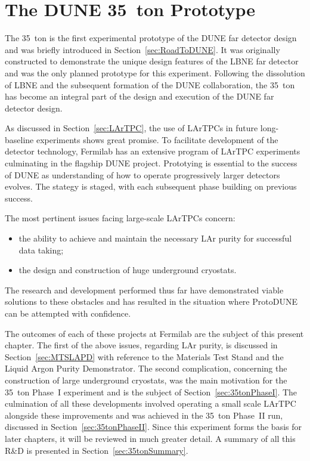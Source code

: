 
\graphicspath{{35ton/Figs/}}

\chapter{The DUNE 35~ton Prototype}\label{chap:35ton}

The 35~ton is the first experimental prototype of the DUNE far detector design and was briefly introduced in Section~\ref{sec:RoadToDUNE}.  It was originally constructed to demonstrate the unique design features of the LBNE far detector and was the only planned prototype for this experiment.  Following the dissolution of LBNE and the subsequent formation of the DUNE collaboration, the 35~ton has become an integral part of the design and execution of the DUNE far detector design.

As discussed in Section~\ref{sec:LArTPC}, the use of LArTPCs in future long-baseline experiments shows great promise.  To facilitate development of the detector technology, Fermilab has an extensive program of LArTPC experiments culminating in the flagship DUNE project.  Prototying is essential to the success of DUNE as understanding of how to operate progressively larger detectors evolves.  The stategy is staged, with each subsequent phase building on previous success.

The most pertinent issues facing large-scale LArTPCs concern:
\begin{itemize}
  \item the ability to achieve and maintain the necessary LAr purity for successful data taking;
  \item the design and construction of huge underground cryostats.
\end{itemize}
The research and development performed thus far have demonstrated viable solutions to these obstacles and has resulted in the situation where ProtoDUNE can be attempted with confidence.

The outcomes of each of these projects at Fermilab are the subject of this present chapter.  The first of the above issues, regarding LAr purity, is discussed in Section~\ref{sec:MTSLAPD} with reference to the Materials Test Stand and the Liquid Argon Purity Demonstrator.  The second complication, concerning the construction of large underground cryostats, was the main motivation for the 35~ton Phase~I experiment and is the subject of Section~\ref{sec:35tonPhaseI}.  The culmination of all these developments involved operating a small scale LArTPC alongside these improvements and was achieved in the 35~ton Phase~II run, discussed in Section~\ref{sec:35tonPhaseII}.  Since this experiment forms the basis for later chapters, it will be reviewed in much greater detail.  A summary of all this R\&D is presented in Section~\ref{sec:35tonSummary}.

